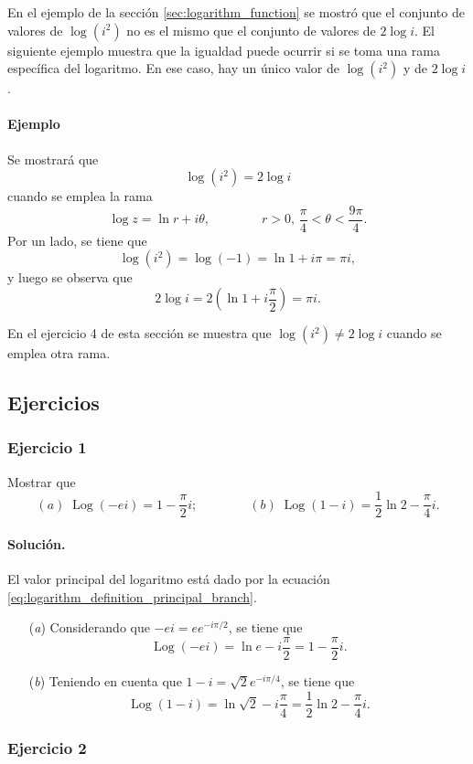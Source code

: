 \documentclass[a4paper]{report}
\DeclareMathOperator{\Log}{Log}
\begin{document}
En el ejemplo de la sección \ref{sec:logarithm_function} se mostró que el conjunto de valores de \(\log(i^2)\) no es el mismo que el conjunto de valores de \(2\log i\). El siguiente ejemplo muestra que la igualdad puede ocurrir si se toma una rama específica del logaritmo. En ese caso, hay un único valor de \(\log(i^2)\) y de \(2\log i\).

\paragraph{Ejemplo} Se mostrará que 
\[
 \log(i^2)=2\log i
\]
cuando se emplea la rama 
\[
 \log z=\ln r+i\theta,\qquad\qquad 
 r>0,\,\frac{\pi}{4}<\theta<\frac{9\pi}{4}.
\]
Por un lado, se tiene que 
\[
 \log(i^2)=\log(-1)=\ln1+i\pi=\pi i,
\]
y luego se observa que 
\[
 2\log i=2\left(\ln1+i\frac{\pi}{2}\right)=\pi i.
\]

En el ejercicio 4 de esta sección se muestra que \(\log(i^2)\neq2\log i\) cuando se emplea otra rama.

\subsection*{Ejercicios}

\subsubsection{Ejercicio 1}

Mostrar que
\[
 (\textit{a})\;\Log(-ei)=1-\frac{\pi}{2}i;\qquad\qquad 
 (\textit{b})\;\Log(1-i)=\frac{1}{2}\ln2-\frac{\pi}{4}i.
\]

\paragraph{Solución.} El valor principal del logaritmo está dado por la ecuación \ref{eq:logarithm_definition_principal_branch}.

\begin{enumerate}
 \item[(\textit{a})] Considerando que \(-ei=ee^{-i\pi/2}\), se tiene que 
 \[
  \Log(-ei)=\ln e-i\frac{\pi}{2}=1-\frac{\pi}{2}i.
 \]
 \item[(\textit{b})] Teniendo en cuenta que \(1-i=\sqrt{2}e^{-i\pi/4}\), se tiene que 
 \[
  \Log(1-i)=\ln\sqrt{2}-i\frac{\pi}{4}=\frac{1}{2}\ln2-\frac{\pi}{4}i.
 \]
\end{enumerate}

\subsubsection{Ejercicio 2}
 
\end{document}
